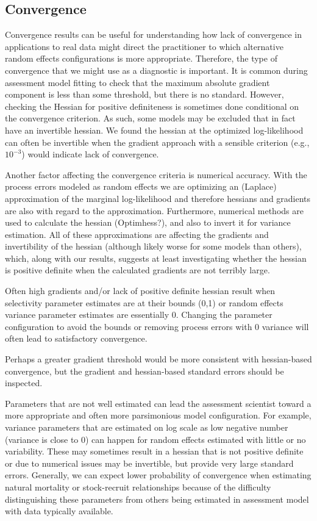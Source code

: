 \documentclass[
  12pt,
]{article}
\begin{document}
\hypertarget{convergence}{%
\subsection*{Convergence}\label{convergence}}

Convergence results can be useful for understanding how lack of
convergence in applications to real data might direct the practitioner
to which alternative random effects configurations is more appropriate.
Therefore, the type of convergence that we might use as a diagnostic is
important. It is common during assessment model fitting to check that
the maximum absolute gradient component is less than some threshold, but
there is no standard. However, checking the Hessian for positive
definiteness is sometimes done conditional on the convergence criterion.
As such, some models may be excluded that in fact have an invertible
hessian. We found the hessian at the optimized log-likelihood can often
be invertible when the gradient approach with a sensible criterion
(e.g., \(10^{-3}\)) would indicate lack of convergence.

Another factor affecting the convergence criteria is numerical accuracy.
With the process errors modeled as random effects we are optimizing an
(Laplace) approximation of the marginal log-likelihood and therefore
hessians and gradients are also with regard to the approximation.
Furthermore, numerical methods are used to calculate the hessian
(Optimhess?), and also to invert it for variance estimation. All of
these approximations are affecting the gradients and invertibility of
the hessian (although likely worse for some models than others), which,
along with our results, suggests at least investigating whether the
hessian is positive definite when the calculated gradients are not
terribly large.

Often high gradients and/or lack of positive definite hessian result
when selectivity parameter estimates are at their bounds (0,1) or random
effects variance parameter estimates are essentially 0. Changing the
parameter configuration to avoid the bounds or removing process errors
with 0 variance will often lead to satisfactory convergence.

Perhaps a greater gradient threshold would be more consistent with
hessian-based convergence, but the gradient and hessian-based standard
errors should be inspected.

Parameters that are not well estimated can lead the assessment scientist
toward a more appropriate and often more parsimonious model
configuration. For example, variance parameters that are estimated on
log scale as low negative number (variance is close to 0) can happen for
random effects estimated with little or no variability. These may
sometimes result in a hessian that is not positive definite or due to
numerical issues may be invertible, but provide very large standard
errors. Generally, we can expect lower probability of convergence when
estimating natural mortality or stock-recruit relationships because of
the difficulty distinguishing these parameters from others being
estimated in assessment model with data typically available.
\end{document}
